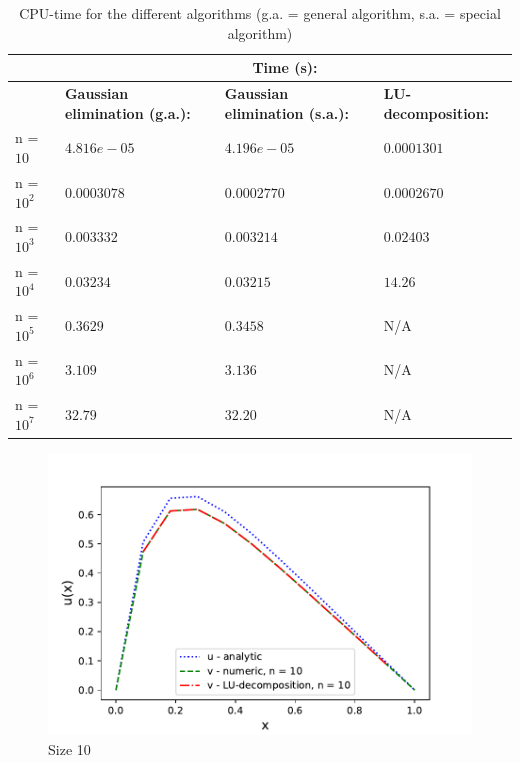 \documentclass{article}
\begin{document}
\begin{table}[]
\begin{tabular}{llll}
           & \multicolumn{3}{c}{\textbf{Time (s):}}                                                                  \\ \hline
           & \textbf{Gaussian elimination (g.a.):} & \textbf{Gaussian elimination (s.a.):} & \textbf{LU-decomposition:} \\ \hline
n = $10$   & $4.816e-05$                              & $4.196e-05$                              & $0.0001301$       \\
n = $10^2$  & $0.0003078$                              & $0.0002770$                              & $0.0002670$       \\
n = $10^3$ & $0.003332$                               & $0.003214$                               & $0.02403$         \\
n = $10^4$ & $0.03234$                                & $0.03215$                                & $14.26$           \\
n = $10^5$ & $0.3629$                                 & $0.3458$                                 & N/A               \\
n = $10^6$ & $3.109$                                  & $3.136$                                  & N/A               \\
n = $10^7$ & $32.79$                                  & $32.20$                                  & N/A              
\end{tabular}
\label{tab:1}
\caption{CPU-time for the different algorithms (g.a. = general algorithm, s.a. = special algorithm)}
\end{table}


\begin{figure}[h]
    \centering
    \includegraphics[width =12cm]{python/size_10.pdf}
    \caption{Size 10}
    \label{fig:1}
\end{figure}
\end{document}
